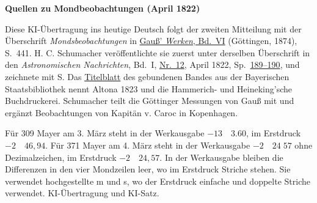 \clearpage\thispagestyle{empty}
\begin{center}\textbf{Quellen zu Mondbeobachtungen (April 1822)}\end{center}
\noindent Diese KI-Übertragung ins heutige Deutsch folgt der zweiten Mitteilung mit der Überschrift \textit{Mondsbeobachtungen} in \href{https://gdz.sub.uni-goettingen.de/id/PPN236007467}{Gauß’ \textit{Werken}, Bd.~VI} (Göttingen, 1874), S.~441. H. C. Schumacher veröffentlichte sie zuerst unter derselben Überschrift in den \textit{Astronomischen Nachrichten}, Bd.~I, \href{https://api.digitale-sammlungen.de/iiif/image/v2/bsb10049426_00103/full/1800,/0/default.jpg}{Nr.~12}, April 1822, Sp.~\href{https://api.digitale-sammlungen.de/iiif/image/v2/bsb10049426_00109/full/1800,/0/default.jpg}{189--190}, und zeichnete mit S. Das \href{https://api.digitale-sammlungen.de/iiif/image/v2/bsb10049426_00005/full/1800,/0/default.jpg}{Titelblatt} des gebundenen Bandes aus der Bayerischen Staatsbibliothek nennt Altona 1823 und die Hammerich- und Heineking’sche Buchdruckerei. Schumacher teilt die Göttinger Messungen von Gauß mit und ergänzt Beobachtungen von Kapitän v. Caroc in Kopenhagen.
\par\smallskip\noindent Für 309 Mayer am 3. März steht in der Werkausgabe $-13\quad3.60$, im Erstdruck $-2\quad46{,}94$. Für 371 Mayer am 4. März steht in der Werkausgabe $-2\quad24\;57$ ohne Dezimalzeichen, im Erstdruck $-2\quad24{,}57$. In der Werkausgabe bleiben die Differenzen in den vier Mondzeilen leer, wo im Erstdruck Striche stehen. Sie verwendet hochgestellte m und s, wo der Erstdruck einfache und doppelte Striche verwendet. KI-Übertragung und KI-Satz.
\clearpage
